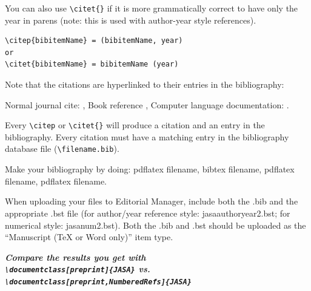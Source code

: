 \documentclass[preprint]{JASA}
\begin{document}
You can also use \verb+\citet{}+ if it is more grammatically correct
to have only the year in parens (note: this is used with author-year style references).

\begin{verbatim}
\citep{bibitemName} = (bibitemName, year)
or
\citet{bibitemName} = bibitemName (year)
\end{verbatim}

Note that the citations are hyperlinked to their entries in the
bibliography:

Normal journal cite: \citep{joursamp1},
 Book reference \citet{booksamp1}, 
Computer language documentation:
\citep{sampcode2}.

Every \verb+\citep+  or \verb+\citet{}+ will produce a citation and an entry in the
bibliography. Every citation must have a matching entry in the
bibliography
database file (\verb+\filename.bib+).

Make your bibliography by doing: pdflatex filename,  bibtex filename,
pdflatex filename,  pdflatex filename.

When uploading your files to Editorial Manager,  include both the .bib and the appropriate .bst file (for author/year reference style: jasaauthoryear2.bst; for numerical style: jasanum2.bst). Both the .bib and .bst should be uploaded as the “Manuscript (TeX or Word only)” item type.

{\bfseries\itshape
Compare the results you get with \\ {\verb+\documentclass[preprint]{JASA}+ } vs.
{\verb+\documentclass[preprint,NumberedRefs]{JASA}+ }
\vskip-36pt}


\end{document}

